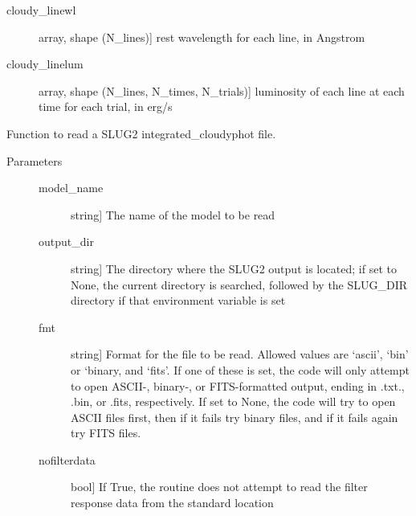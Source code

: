 \documentclass[letterpaper,10pt,english]{sphinxmanual}
\begin{document}
\begin{fulllineitems}
\begin{description}
\begin{description}
\item[{cloudy\_linewl}] \leavevmode{[}array, shape (N\_lines){]}
rest wavelength for each line, in Angstrom

\item[{cloudy\_linelum}] \leavevmode{[}array, shape (N\_lines, N\_times, N\_trials){]}
luminosity of each line at each time for each trial, in erg/s

\end{description}

\end{description}

\end{fulllineitems}


\begin{fulllineitems}
\label{cloudy:slugpy.cloudy.read_integrated_cloudyphot}
Function to read a SLUG2 integrated\_cloudyphot file.
\begin{description}
\item[{Parameters}] \leavevmode\begin{description}
\item[{model\_name}] \leavevmode{[}string{]}
The name of the model to be read

\item[{output\_dir}] \leavevmode{[}string{]}
The directory where the SLUG2 output is located; if set to None,
the current directory is searched, followed by the SLUG\_DIR
directory if that environment variable is set

\item[{fmt}] \leavevmode{[}string{]}
Format for the file to be read. Allowed values are `ascii',
`bin' or `binary, and `fits'. If one of these is set, the code
will only attempt to open ASCII-, binary-, or FITS-formatted
output, ending in .txt., .bin, or .fits, respectively. If set
to None, the code will try to open ASCII files first, then if
it fails try binary files, and if it fails again try FITS
files.

\item[{nofilterdata}] \leavevmode{[}bool{]}
If True, the routine does not attempt to read the filter
response data from the standard location


\end{description}
\end{description}
\end{fulllineitems}
\end{document}
